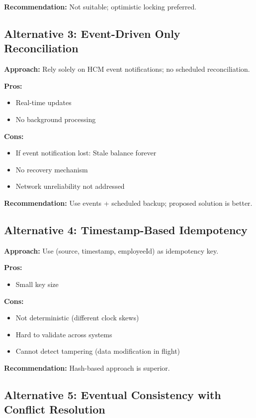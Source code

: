 \documentclass[12pt,a4paper]{article}
\begin{document}
\textbf{Recommendation:} Not suitable; optimistic locking preferred.

\subsection{Alternative 3: Event-Driven Only Reconciliation}

\textbf{Approach:} Rely solely on HCM event notifications; no scheduled reconciliation.

\textbf{Pros:}
\begin{itemize}
    \item Real-time updates
    \item No background processing
\end{itemize}

\textbf{Cons:}
\begin{itemize}
    \item If event notification lost: Stale balance forever
    \item No recovery mechanism
    \item Network unreliability not addressed
\end{itemize}

\textbf{Recommendation:} Use events + scheduled backup; proposed solution is better.

\subsection{Alternative 4: Timestamp-Based Idempotency}

\textbf{Approach:} Use (source, timestamp, employeeId) as idempotency key.

\textbf{Pros:}
\begin{itemize}
    \item Small key size
\end{itemize}

\textbf{Cons:}
\begin{itemize}
    \item Not deterministic (different clock skews)
    \item Hard to validate across systems
    \item Cannot detect tampering (data modification in flight)
\end{itemize}

\textbf{Recommendation:} Hash-based approach is superior.

\subsection{Alternative 5: Eventual Consistency with Conflict Resolution}
\end{document}
